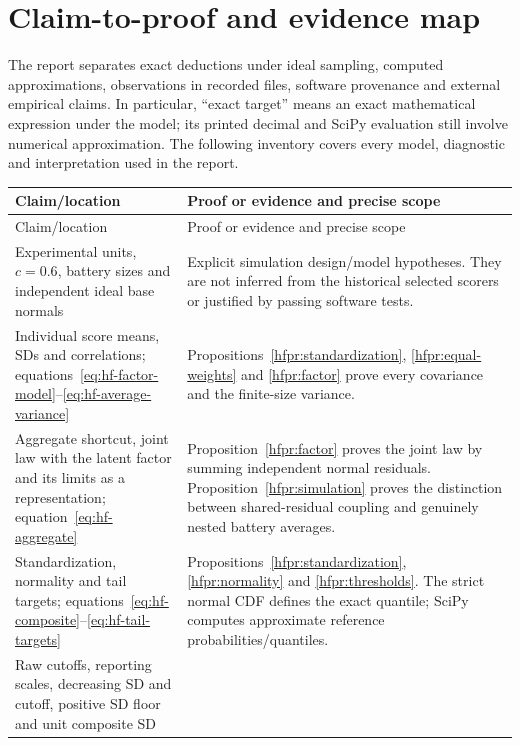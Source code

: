 \chapter{Claim-to-proof and evidence map}
\label{hfmap:simulation}

The report separates exact deductions under ideal sampling, computed
approximations, observations in recorded files, software provenance and
external empirical claims. In particular, ``exact target'' means an exact
mathematical expression under the model; its printed decimal and SciPy
evaluation still involve numerical approximation. The following inventory
covers every model, diagnostic and interpretation used in the report.

\begingroup\small
\setlength{\tabcolsep}{4pt}
\begin{longtable}{>{\raggedright\arraybackslash}p{.35\linewidth}>{\raggedright\arraybackslash}p{.59\linewidth}}
\toprule
Claim/location & Proof or evidence and precise scope\\
\midrule
\endfirsthead
\toprule Claim/location & Proof or evidence and precise scope\\\midrule
\endhead
\bottomrule\endfoot
Experimental units, \(c=0.6\), battery sizes and independent ideal base
normals &
Explicit simulation design/model hypotheses. They are not inferred from
the historical selected scorers or justified by passing software tests.\\
Individual score means, SDs and correlations;
equations~\ref{eq:hf-factor-model}--\ref{eq:hf-average-variance} &
Propositions~\ref{hfpr:standardization}, \ref{hfpr:equal-weights} and
\ref{hfpr:factor} prove every covariance and the finite-size variance.\\
Aggregate shortcut, joint law with the latent factor and its limits as a
representation; equation~\ref{eq:hf-aggregate} &
Proposition~\ref{hfpr:factor} proves the joint law by summing independent
normal residuals. Proposition~\ref{hfpr:simulation} proves the distinction
between shared-residual coupling and genuinely nested battery averages.\\
Standardization, normality and tail targets;
equations~\ref{eq:hf-composite}--\ref{eq:hf-tail-targets} &
Propositions~\ref{hfpr:standardization}, \ref{hfpr:normality} and
\ref{hfpr:thresholds}. The strict normal CDF defines the exact quantile;
SciPy computes approximate reference probabilities/quantiles.\\
Raw cutoffs, reporting scales, decreasing SD and cutoff, positive SD
floor and unit composite SD &

\end{longtable}
